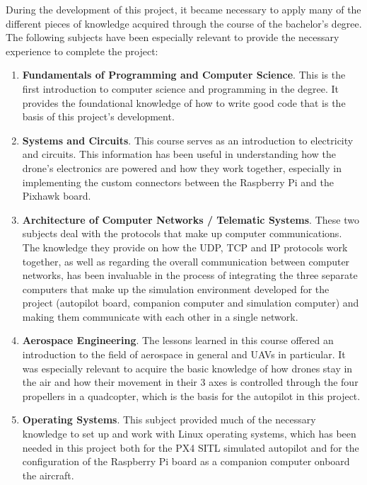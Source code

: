 During the development of this project, it became necessary to apply many of the different pieces of knowledge acquired through the course of the bachelor's degree.
The following subjects have been especially relevant to provide the necessary experience to complete the project:

\begin{enumerate}
    \item \textbf{Fundamentals of Programming and Computer Science}. This is the first introduction to computer science and programming in the degree. It provides the foundational knowledge of how to write good code that is the basis of this project's development.
    
    \item \textbf{Systems and Circuits}. This course serves as an introduction to electricity and circuits. This information has been useful in understanding how the drone's electronics are powered and how they work together, especially in implementing the custom connectors between the Raspberry Pi and the Pixhawk board.
    
    \item \textbf{Architecture of Computer Networks / Telematic Systems}. These two subjects deal with the protocols that make up computer communications. The knowledge they provide on how the UDP, TCP and IP protocols work together, as well as regarding the overall communication between computer networks, has been invaluable in the process of integrating the three separate computers that make up the simulation environment developed for the project (autopilot board, companion computer and simulation computer) and making them communicate with each other in a single network.
    
    \item \textbf{Aerospace Engineering}. The lessons learned in this course offered an introduction to the field of aerospace in general and UAVs in particular. It was especially relevant to acquire the basic knowledge of how drones stay in the air and how their movement in their 3 axes is controlled through the four propellers in a quadcopter, which is the basis for the autopilot in this project.
    
    \item \textbf{Operating Systems}. This subject provided much of the necessary knowledge to set up and work with Linux operating systems, which has been needed in this project both for the PX4 SITL simulated autopilot and for the configuration of the Raspberry Pi board as a companion computer onboard the aircraft.
    

\end{enumerate}
